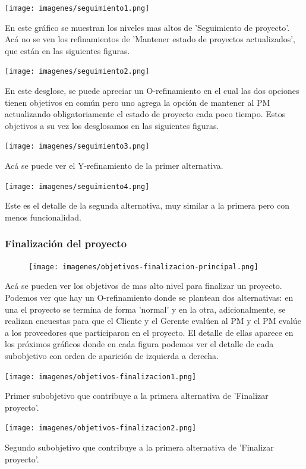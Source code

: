 \texttt{[image: imagenes/seguimiento1.png]}

En este gráfico se muestran los niveles mas altos de 'Seguimiento de proyecto'. Acá no se ven los refinamientos de 'Mantener estado de proyectos actualizados', que están en las siguientes figuras.

\texttt{[image: imagenes/seguimiento2.png]}

En este desglose, se puede apreciar un O-refinamiento en el cual las dos opciones tienen objetivos en común pero uno agrega la opción de mantener al PM actualizando obligatoriamente el estado de proyecto cada poco tiempo. Estos objetivos a su vez los desglosamos en las siguientes figuras.

\texttt{[image: imagenes/seguimiento3.png]}

Acá se puede ver el Y-refinamiento de la primer alternativa.

\texttt{[image: imagenes/seguimiento4.png]}

Este es el detalle de la segunda alternativa, muy similar a la primera pero con menos funcionalidad.

\newpage

\subsubsection{Finalización del proyecto}

\begin{figure}[H]
    \centering
    \texttt{[image: imagenes/objetivos-finalizacion-principal.png]}
\end{figure}

Acá se pueden ver los objetivos de mas alto nivel para finalizar un proyecto. Podemos ver que hay un O-refinamiento donde se plantean dos alternativas: en una el proyecto se termina de forma 'normal' y en la otra, adicionalmente, se realizan encuestas para que el Cliente y el Gerente evalúen al PM y el PM evalúe a los proveedores que participaron en el proyecto. El detalle de ellas aparece en los próximos gráficos donde en cada figura podemos ver el detalle de cada subobjetivo con orden de aparición de izquierda a derecha.

\texttt{[image: imagenes/objetivos-finalizacion1.png]}

Primer subobjetivo que contribuye a la primera alternativa de 'Finalizar proyecto'.

\texttt{[image: imagenes/objetivos-finalizacion2.png]}

Segundo subobjetivo que contribuye a la primera alternativa de 'Finalizar proyecto'.

